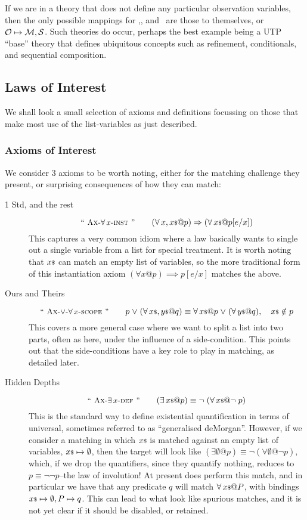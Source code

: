 If we are in a theory that does not define any particular observation variables,
then the only possible mappings for \OBS,\MDL, and \SCR\ are those to themselves,
or $\mathcal O \mapsto \mathcal M,\mathcal S$.
Such theories do occur, perhaps the best example being a UTP ``base'' theory
that defines ubiquitous concepts such as refinement, conditionals,
and sequential composition.

\subsection{Laws of Interest}
We shall look a small selection of axioms and definitions
focussing on those that make most use of the list-variables as just described.

\subsubsection{Axioms of Interest}

We consider 3 axioms to be worth noting,
either for the matching challenge they present,
or surprising consequences of how they can match:
\begin{description}
  \item[1 Std, and the rest]
     \[
       \AXallOInstN \qquad \AXallOInst
     \]
     This captures a very common idiom where a law basically wants
     to single out a single variable from a list for special treatment.
     It is worth noting that ${x}{\scriptstyle\$}$ can match an empty list of variables,
     so the more traditional form of this instantiation axiom
     $(\forall x@p)\implies p[e/x]$ matches the above.
  \item[Ours and Theirs]
     \[
          \AXorAllOScopeN \qquad  \AXorAllOScope
     \]
     This covers a more general case where we want to split a list into two
     parts, often as here, under the influence of a side-condition.
     This points out that the side-conditions have a key role to play
     in matching, as detailed later.
  \item[Hidden Depths]
     \[
       \AXanyODefN \qquad  \AXanyODef
     \]
     This is the standard way to define existential quantification
     in terms of universal, sometimes referred to as ``generalised deMorgan''.
     However, if we consider a matching in which ${x}{\scriptstyle\$}$ is matched against
     an empty list of variables, ${x}{\scriptstyle\$} \mapsto \emptyset$,
     then the target will look like
     $(\exists \emptyset @ p) \equiv \lnot(\forall\emptyset@\lnot p)$,
     which, if we drop the quantifiers, since they quantify nothing,
     reduces to $p \equiv \lnot\lnot p$--the law of involution!
     At present  does perform this match,
     and in particular we have that any predicate $q$
     will match $\forall \lst x @ P$, with bindings ${x}{\scriptstyle\$} \mapsto \emptyset, P \mapsto q$.
     This can lead to what look like spurious matches,
     and it is not yet clear if it should be disabled, or retained.
\end{description}

